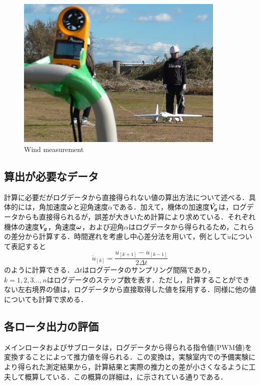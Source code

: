 \begin{figure}[H]
	\centering
	\includegraphics[clip,width=10.0cm,bb=0 0 1250 750]{./z_figure_files/chapter4/wind_measure.jpeg}
	\caption{Wind measurement}
	\label{fig:wind_measure}
\end{figure}


\subsection{算出が必要なデータ}

計算に必要だがログデータから直接得られない値の算出方法について述べる．具体的には，角加速度$\mbox{\boldmath $\dot{\omega}$}$と迎角速度$\dot{\alpha}$である．加えて，機体の加速度$\mbox{\boldmath $\dot{V_g}$}$は，ログデータからも直接得られるが，誤差が大きいため計算により求めている．それぞれ機体の速度$\mbox{\boldmath $V_g$}$，角速度$\mbox{\boldmath $\omega$}$，および迎角$\alpha$はログデータから得られるため，これらの差分から計算する．時間遅れを考慮し中心差分法を用いて，例として$\dot{u}$について表記すると
\begin{equation}
  \dot{u}_{[k]} = \dfrac{u_{[k+1]}-u_{[k-1]}}{2\Delta t}
\end{equation}
のように計算できる\cite{kawata}．$\Delta t$はログデータのサンプリング間隔であり，$k=1,2,3\hdots,n$はログデータのステップ数を表す．ただし，計算することができない左右境界の値は，ログデータから直接取得した値を採用する．同様に他の値についても計算で求める．

\subsection{各ロータ出力の評価}

メインロータおよびサブロータは，ログデータから得られる指令値(PWM値)を変換することによって推力値を得られる．この変換は，実験室内での予備実験により得られた測定結果から，計算結果と実際の推力との差が小さくなるように工夫して概算している．この概算の詳細は，\cite{yoshikawa}に示されている通りである．

